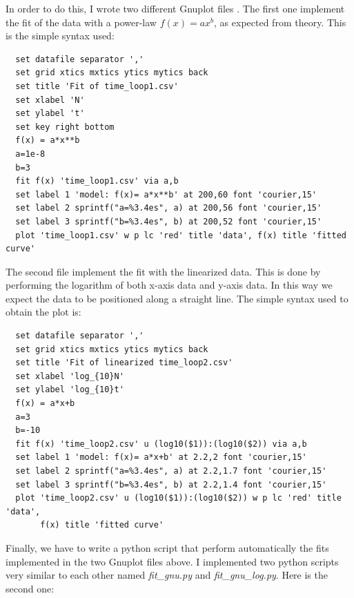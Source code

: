 \documentclass[prb,9pt,notitlepage]{revtex4-1}
\begin{document}
In order to do this, I wrote two different Gnuplot files . The first one implement the fit of the data with a power-law $f(x)=ax^b$, as expected from theory. This is the simple syntax used:
\begin{lstlisting}
  set datafile separator ','
  set grid xtics mxtics ytics mytics back
  set title 'Fit of time_loop1.csv'
  set xlabel 'N'
  set ylabel 't'
  set key right bottom
  f(x) = a*x**b
  a=1e-8
  b=3
  fit f(x) 'time_loop1.csv' via a,b
  set label 1 'model: f(x)= a*x**b' at 200,60 font 'courier,15'
  set label 2 sprintf("a=%3.4es", a) at 200,56 font 'courier,15'
  set label 3 sprintf("b=%3.4es", b) at 200,52 font 'courier,15'
  plot 'time_loop1.csv' w p lc 'red' title 'data', f(x) title 'fitted curve'
\end{lstlisting}
The second file implement the fit with the linearized data. This is done by performing the logarithm of both x-axis data and y-axis data. In this way we expect the data to be positioned along a straight line. The simple syntax used to obtain the plot is:
\begin{lstlisting}
  set datafile separator ','
  set grid xtics mxtics ytics mytics back
  set title 'Fit of linearized time_loop2.csv'
  set xlabel 'log_{10}N'
  set ylabel 'log_{10}t'
  f(x) = a*x+b
  a=3
  b=-10
  fit f(x) 'time_loop2.csv' u (log10($1)):(log10($2)) via a,b
  set label 1 'model: f(x)= a*x+b' at 2.2,2 font 'courier,15'
  set label 2 sprintf("a=%3.4es", a) at 2.2,1.7 font 'courier,15'
  set label 3 sprintf("b=%3.4es", b) at 2.2,1.4 font 'courier,15'
  plot 'time_loop2.csv' u (log10($1)):(log10($2)) w p lc 'red' title 'data',
       f(x) title 'fitted curve'
\end{lstlisting}
Finally, we have to write a python script that perform automatically the fits implemented in the two Gnuplot files above. I implemented two python scripts very similar to each other named \textit{fit\_gnu.py} and \textit{fit\_gnu\_log.py}. Here is the second one:

\end{document}
